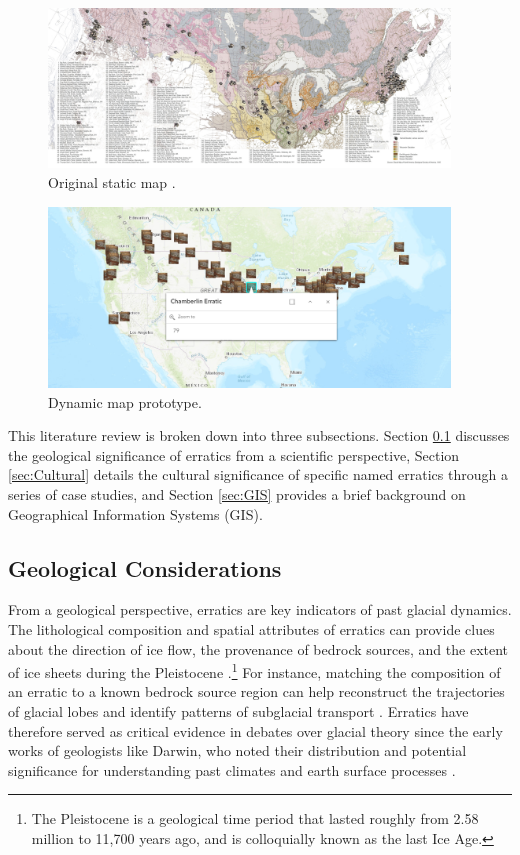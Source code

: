 \documentclass{article}
\begin{document}
\begin{figure}[H]
    \centering
    \includegraphics[width=0.95\textwidth]{Images/JanesMap.jpg}
    \caption{Original static map \cite{Hutton2012}.}
    \label{fig:original_map}
\end{figure}

\begin{figure}[H]
    \centering
    \includegraphics[width=0.95\textwidth]{Images/DigitizedMap.png}
    \caption{Dynamic map prototype.}
    \label{fig:prototype}
\end{figure}

This literature review is broken down into three subsections. Section \ref{sec:Geological} discusses the geological significance of erratics from a scientific perspective, Section \ref{sec:Cultural} details the cultural significance of specific named erratics through a series of case studies, and Section \ref{sec:GIS} provides a brief background on Geographical Information Systems (GIS).

\subsection{Geological Considerations}\label{sec:Geological}
From a geological perspective, erratics are key indicators of past glacial dynamics. The lithological composition and spatial attributes of erratics can provide clues about the direction of ice flow, the provenance of bedrock sources, and the extent of ice sheets during the Pleistocene \cite{Bond1992, Evenson2009, Clark2018}.\footnote{The Pleistocene is a geological time period that lasted roughly from 2.58 million to 11,700 years ago, and is colloquially known as the last Ice Age.} For instance, matching the composition of an erratic to a known bedrock source region can help reconstruct the trajectories of glacial lobes and identify patterns of subglacial transport \cite{Colgan2009, Emery2023}. Erratics have therefore served as critical evidence in debates over glacial theory since the early works of geologists like Darwin, who noted their distribution and potential significance for understanding past climates and earth surface processes \cite{DARWIN1842}.
\end{document}
